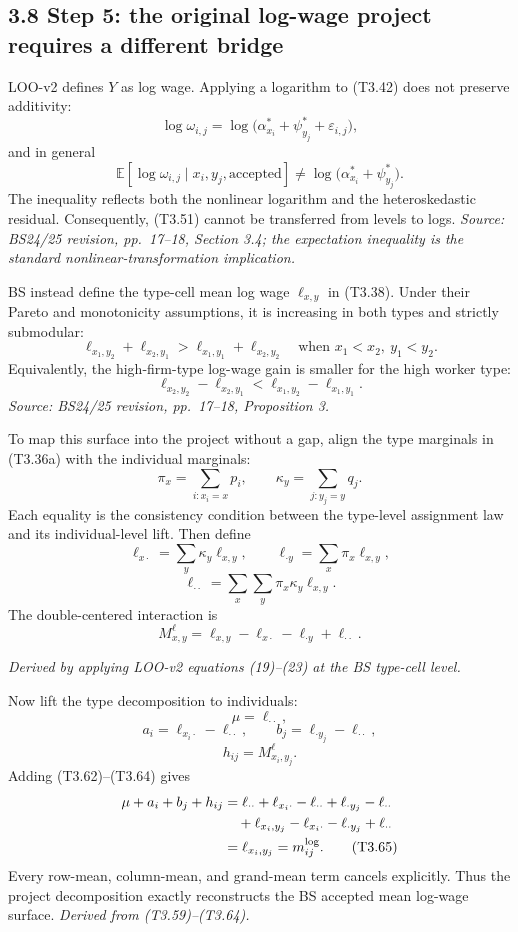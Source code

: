 \documentclass[11pt]{article}
\begin{document}
\subsection{3.8 Step 5: the original log-wage project requires a different bridge}

LOO-v2 defines \(Y\) as log wage.  Applying a logarithm to (T3.42) does not
preserve additivity:
\[
\log\omega_{i,j}
=
\log\bigl(
\alpha^*_{x_i}+\psi^*_{y_j}+\varepsilon_{i,j}
\bigr),
\tag{T3.54}
\]
and in general
\[
\mathbb E[\log\omega_{i,j}\mid x_i,y_j,\text{accepted}]
\neq
\log\bigl(\alpha^*_{x_i}+\psi^*_{y_j}\bigr).
\tag{T3.55}
\]
The inequality reflects both the nonlinear logarithm and the
heteroskedastic residual.  Consequently, (T3.51) cannot be transferred from
levels to logs.
\textit{Source: BS24/25 revision, pp.\ 17--18, Section 3.4; the expectation
inequality is the standard nonlinear-transformation implication.}

BS instead define the type-cell mean log wage \(\ell_{x,y}\) in (T3.38).
Under their Pareto and monotonicity assumptions, it is increasing in both
types and strictly submodular:
\[
\ell_{x_1,y_2}+\ell_{x_2,y_1}
>
\ell_{x_1,y_1}+\ell_{x_2,y_2}
\quad
\text{when }x_1<x_2,\ y_1<y_2.
\tag{T3.56}
\]
Equivalently, the high-firm-type log-wage gain is smaller for the high worker
type:
\[
\ell_{x_2,y_2}-\ell_{x_2,y_1}
<
\ell_{x_1,y_2}-\ell_{x_1,y_1}.
\tag{T3.57}
\]
\textit{Source: BS24/25 revision, pp.\ 17--18, Proposition 3.}

To map this surface into the project without a gap, align the type marginals
in (T3.36a) with the individual marginals:
\[
\pi_x=\sum_{i:x_i=x}p_i,
\qquad
\kappa_y=\sum_{j:y_j=y}q_j.
\tag{T3.58}
\]
Each equality is the consistency condition between
the type-level assignment law and its individual-level lift.
Then define
\[
\ell_{x\cdot}=\sum_y\kappa_y\ell_{x,y},
\qquad
\ell_{\cdot y}=\sum_x\pi_x\ell_{x,y},
\tag{T3.59}
\]
\[
\ell_{\cdot\cdot}
=
\sum_x\sum_y\pi_x\kappa_y\ell_{x,y}.
\tag{T3.60}
\]
The double-centered interaction is
\[
M^\ell_{x,y}
=
\ell_{x,y}-\ell_{x\cdot}-\ell_{\cdot y}
+\ell_{\cdot\cdot}.
\tag{T3.61}
\]

\textit{Derived by applying LOO-v2 equations (19)--(23) at the BS type-cell
level.}

Now lift the type decomposition to individuals:
\[
\mu=\ell_{\cdot\cdot},
\tag{T3.62}
\]
\[
a_i=\ell_{x_i\cdot}-\ell_{\cdot\cdot},
\qquad
b_j=\ell_{\cdot y_j}-\ell_{\cdot\cdot},
\tag{T3.63}
\]
\[
h_{ij}=M^\ell_{x_i,y_j}.
\tag{T3.64}
\]
Adding (T3.62)--(T3.64) gives
\begin{align}
\mu+a_i+b_j+h_{ij}
&=
\ell_{\cdot\cdot}
+\ell_{x_i\cdot}-\ell_{\cdot\cdot}
+\ell_{\cdot y_j}-\ell_{\cdot\cdot} \notag\\
&\quad
+\ell_{x_i,y_j}-\ell_{x_i\cdot}
-\ell_{\cdot y_j}+\ell_{\cdot\cdot} \notag\\
&=
\ell_{x_i,y_j}
=m^{\log}_{ij}.
\tag{T3.65}
\end{align}
Every row-mean, column-mean, and grand-mean term cancels explicitly.  Thus the
project decomposition exactly reconstructs the BS accepted mean log-wage
surface.
\textit{Derived from (T3.59)--(T3.64).}
\end{document}

